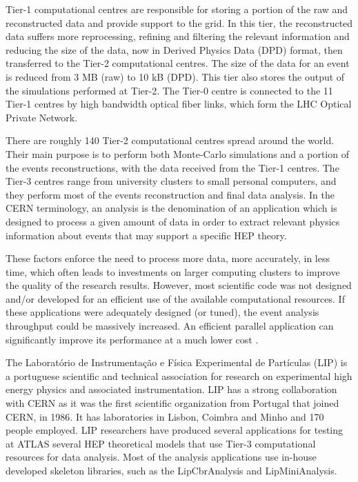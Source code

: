 Tier-1 computational centres are responsible for storing a portion of the raw and reconstructed data and provide support to the grid. In this tier, the reconstructed data suffers more reprocessing, refining and filtering the relevant information and reducing the size of the data, now in Derived Physics Data (DPD) format, then transferred to the Tier-2 computational centres. The size of the data for an event is reduced from 3 MB (raw) to 10 kB (DPD). This tier also stores the output of the simulations performed at Tier-2. The Tier-0 centre is connected to the 11 Tier-1 centres by high bandwidth optical fiber links, which form the LHC Optical Private Network.

There are roughly 140 Tier-2 computational centres spread around the world. Their main purpose is to perform both Monte-Carlo simulations and a portion of the events reconstructions, with the data received from the Tier-1 centres. The Tier-3 centres range from university clusters to small personal computers, and they perform most of the events reconstruction and final data analysis. In the CERN terminology, an analysis is the denomination of an application which is designed to process a given amount of data in order to extract relevant physics information about events that may support a specific HEP theory.

These factors enforce the need to process more data, more accurately, in less time, which often leads to investments on larger computing clusters to improve the quality of the research results. However, most scientific code was not designed and/or developed for an efficient use of the available computational resources. If these applications were adequately designed (or tuned), the event analysis throughput could be massively increased. An efficient parallel application can significantly improve its performance at a much lower cost \cite{Msc:AMP}.

The Laboratório de Instrumentação e Física Experimental de Partículas (LIP) \cite{LIP} is a portuguese scientific and technical association for research on experimental high energy physics and associated instrumentation. LIP has a strong collaboration with CERN as it was the first scientific organization from Portugal that joined CERN, in 1986. It has laboratories in Lisbon, Coimbra and Minho and 170 people employed. LIP researchers have produced several applications for testing at ATLAS several HEP theoretical models that use Tier-3 computational resources for data analysis. Most of the analysis applications use in-house developed skeleton libraries, such as the LipCbrAnalysis and LipMiniAnalysis.

